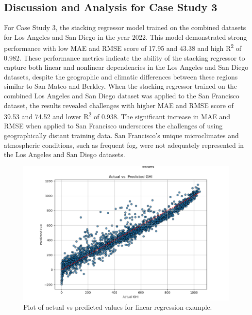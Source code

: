 \documentclass[10pt,twocolumn]{article}
\begin{document}
\subsection{Discussion and Analysis for Case Study 3}
For Case Study 3, the stacking regressor model trained on the combined datasets for Los Angeles and San Diego in the year 2022. This model demonstrated strong performance with low MAE and RMSE score of 17.95 and 43.38 and high R\textsuperscript{2} of 0.982. These performance metrics  indicate the ability of the stacking regressor to capture both linear and nonlinear dependencies in the Los Angeles and San Diego datasets, despite the geographic and climatic differences between these regions similar to San Mateo and Berkley. 
When the stacking regressor trained on the combined Los Angeles and San Diego dataset was applied to the San Francisco dataset, the results revealed challenges with higher MAE and RMSE score of 39.53 and 74.52 and lower R\textsuperscript{2} of 0.938. The significant increase in MAE and RMSE when applied to San Francisco underscores the challenges of using geographically distant training data. San Francisco's unique microclimates and atmospheric conditions, such as frequent fog, were not adequately represented in the Los Angeles and San Diego datasets.
\begin{figure}
            \centering
            \includegraphics[width=1\linewidth]{ActualvsPredictedlinreg.png}
            \caption{Plot of actual vs predicted values for linear regression example.}
            \label{fig:enter-label}
        \end{figure}
         
\end{document}
